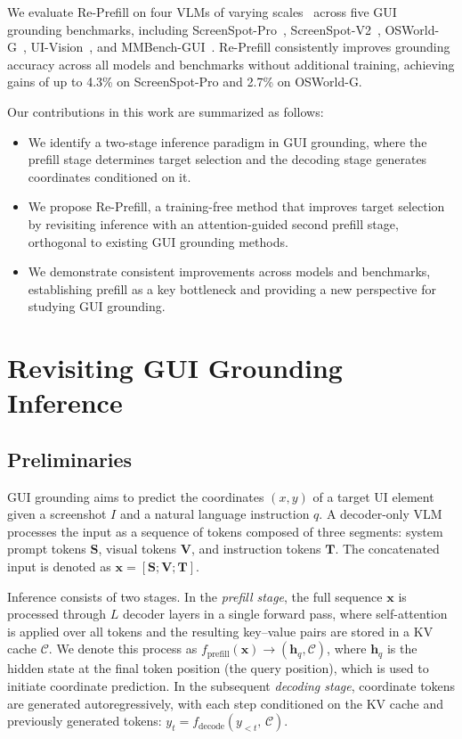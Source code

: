 \documentclass{article}
\begin{document}
We evaluate Re-Prefill on four VLMs of varying scales~\citep{maiui, guiowl, qwen3vl} across five GUI grounding benchmarks, including ScreenSpot-Pro~\citep{sspro}, ScreenSpot-V2~\citep{osatlas}, OSWorld-G~\citep{osworldg}, UI-Vision~\citep{uivision}, and MMBench-GUI~\citep{mmbench}.
Re-Prefill consistently improves grounding accuracy across all models and benchmarks without additional training, achieving gains of up to 4.3\% on ScreenSpot-Pro and 2.7\% on OSWorld-G.

Our contributions in this work are summarized as follows:
\begin{itemize}[leftmargin=2em, itemsep=2pt]
\item We identify a two-stage inference paradigm in GUI grounding, where the prefill stage determines target selection and the decoding stage generates coordinates conditioned on it.
\item We propose Re-Prefill, a training-free method that improves target selection by revisiting inference with an attention-guided second prefill stage, orthogonal to existing GUI grounding methods.
\item We demonstrate consistent improvements across models and benchmarks, establishing prefill as a key bottleneck and providing a new perspective for studying GUI grounding.
\end{itemize}


\section{Revisiting GUI Grounding Inference}
\label{sec:analysis}

\subsection{Preliminaries}
\label{sec:preliminary}

GUI grounding aims to predict the coordinates $(x, y)$ of a target UI element given a screenshot $I$ and a natural language instruction $q$. 
A decoder-only VLM processes the input as a sequence of tokens composed of three segments: system prompt tokens $\mathbf{S}$, visual tokens $\mathbf{V}$, and instruction tokens $\mathbf{T}$. 
The concatenated input is denoted as $\mathbf{x} = [\mathbf{S}; \mathbf{V}; \mathbf{T}]$.

Inference consists of two stages. 
In the \emph{prefill stage}, the full sequence $\mathbf{x}$ is processed through $L$ decoder layers in a single forward pass, where self-attention is applied over all tokens and the resulting key--value pairs are stored in a KV cache $\mathcal{C}$. 
We denote this process as $f_{\mathrm{prefill}}(\mathbf{x}) \rightarrow (\mathbf{h}_q, \mathcal{C})$, where $\mathbf{h}_q$ is the hidden state at the final token position (the query position), which is used to initiate coordinate prediction.
In the subsequent \emph{decoding stage}, coordinate tokens are generated autoregressively, with each step conditioned on the KV cache and previously generated tokens: $y_t = f_{\mathrm{decode}}(y_{<t},\, \mathcal{C})$.
\end{document}
